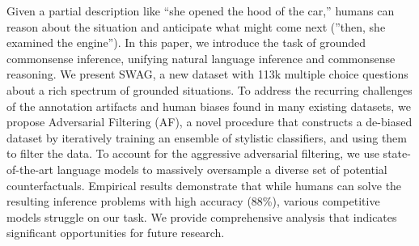 Given a partial description like ``she opened the hood of the car,'' humans can reason about the situation and anticipate what might come next (''then, she examined the engine''). In this paper, we introduce the task of grounded commonsense inference, unifying natural language inference and commonsense reasoning. We present SWAG, a new dataset with 113k multiple choice questions about a rich spectrum of grounded situations. To address the recurring challenges of the annotation artifacts and human biases found in many existing datasets, we propose Adversarial Filtering (AF), a novel procedure that constructs a de-biased dataset by iteratively training an ensemble of stylistic classifiers, and using them to filter the data. To account for the aggressive adversarial filtering, we use state-of-the-art language models to massively oversample a diverse set of potential counterfactuals. Empirical results demonstrate that while humans can solve the resulting inference problems with high accuracy (88\%), various competitive models struggle on our task. We provide comprehensive analysis that indicates significant opportunities for future research.
